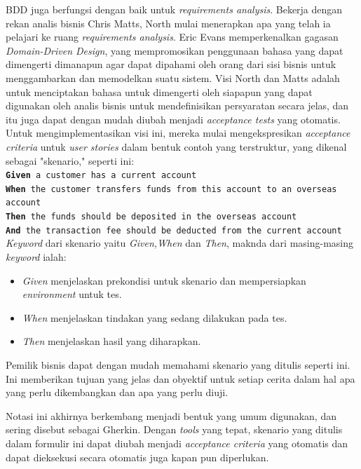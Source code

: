 BDD juga berfungsi dengan baik untuk \textit{requirements analysis}. Bekerja dengan rekan analis bisnis Chris Matts, North mulai menerapkan apa yang telah ia pelajari ke ruang \textit{requirements analysis}. Eric Evans memperkenalkan gagasan \textit{Domain-Driven Design}, yang mempromosikan penggunaan bahasa yang dapat dimengerti dimanapun agar dapat dipahami oleh  orang dari sisi bisnis untuk menggambarkan dan memodelkan suatu sistem. Visi North dan Matts adalah untuk menciptakan bahasa untuk dimengerti oleh siapapun yang dapat digunakan oleh analis bisnis untuk mendefinisikan persyaratan secara jelas, dan itu juga dapat dengan mudah diubah menjadi \textit{acceptance tests} yang otomatis. Untuk mengimplementasikan visi ini, mereka mulai mengekspresikan \textit{acceptance criteria} untuk \textit{user stories} dalam bentuk contoh yang terstruktur, yang dikenal sebagai "skenario," seperti ini:\\
\texttt{\textbf{Given} a customer has a current account \\
\textbf{When} the customer transfers funds from this account to an overseas account\\
\textbf{Then} the funds should be deposited in the overseas account\\
\textbf{And} the transaction fee should be deducted from the current account\\}
\textit{Keyword} dari skenario yaitu \textit{Given,When} dan \textit{Then}, maknda dari masing-masing \textit{keyword} ialah: 
\begin{itemize}
 \item \textit{Given} menjelaskan prekondisi untuk skenario dan mempersiapkan \textit{environment} untuk tes.
 \item \textit{When} menjelaskan tindakan yang sedang dilakukan pada tes.
 \item \textit{Then} menjelaskan hasil yang diharapkan.
\end{itemize}

Pemilik bisnis dapat dengan mudah memahami skenario yang ditulis seperti ini. Ini memberikan tujuan yang jelas dan obyektif untuk setiap cerita dalam hal apa yang perlu dikembangkan dan apa yang perlu diuji.

Notasi ini akhirnya berkembang menjadi bentuk yang umum digunakan, dan sering disebut sebagai Gherkin. Dengan \textit{tools} yang tepat, skenario yang ditulis dalam formulir ini dapat diubah menjadi \textit{acceptance criteria} yang otomatis dan dapat dieksekusi secara otomatis juga kapan pun diperlukan. 

